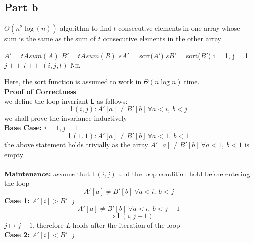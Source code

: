 \documentclass[12pt]{article}
\begin{document}
\subsection*{Part b}
\begin{algorithm}[H]
\caption{$\varTheta(n^2 \log(n))$ algorithm to find $t$ consecutive elements in one array whose sum is the same as the sum of $t$ consecutive elements in the other array}
\begin{algorithmic}[1]
        \State $A' = tAsum(A)$
        \State $B' = tAsum(B)$
        \State $sA'$ = sort($A'$)\;
        \State $sB'$ = sort($B'$)\;
        \State i = 1, j = 1\;
                \State $j++$\;
                \State $i++$\;
            \Else
                \State \Return $(i, j, t)$\;
            \EndIf
        \EndWhile
    \EndFor
    \State \Return \textsc{Nil}\;
\end{algorithmic}
\end{algorithm}
Here, the sort function is assumed to work in $\varTheta(n \log n)$ time.\\
\textbf{Proof of Correctness}\\
we define the loop invariant $\mathsf{L}$ as follows:\\
$$\mathsf{L}(i, j): A'[a] \neq B'[b] ~ \forall a < i, ~ b < j$$
we shall prove the invariance inductively\\
\textbf{Base Case:} $i = 1, j = 1$\\
$$\mathsf{L}(1, 1): A'[a] \neq B'[b] ~ \forall a < 1, ~ b < 1$$
the above statement holds trivially as the array $A'[a] \neq B'[b] ~ \forall a < 1, ~ b < 1$ is empty\\\\
\textbf{Maintenance:} assume that $\mathsf{L}(i, j)$ and the loop condition hold before entering the loop\\
$$A'[a] \neq B'[b] ~ \forall a < i, ~ b < j$$
\textbf{Case 1:} $A'[i] > B'[j]$\\
    $$A'[a] \neq B'[b] ~ \forall a < i, ~ b < j+1$$
    $$\implies \mathsf{L}(i, j+1)$$
    $j \mapsto j+1$, therefore $L$ holds after the iteration of the loop\\
\textbf{Case 2:} $A'[i] < B'[j]$\\
\end{document}
